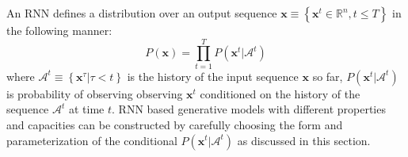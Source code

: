 \documentclass{article} %
\begin{document}





An RNN defines a distribution over an output sequence $ \mathbf{x} \equiv \left\{ \mathbf{x}^t \in \mathbb{R}^n, t \leq T \right\}$ in the following manner:
$$ P(\mathbf{x}) = \prod_{t=1}^{T} P(\mathbf{x}^t|\mathcal{A}^t)$$
where $\mathcal{A}^t \equiv \left\{ \mathbf{x}^{\tau}|\tau < t \right\}$ is the history of the input sequence $\mathbf{x}$ so far, $P(\mathbf{x}^t|\mathcal{A}^t)$ is probability of observing observing $\mathbf{x}^t$ conditioned on the history of the sequence $\mathcal{A}^t$ at time $t$. RNN based generative models with different properties and capacities can be constructed by carefully choosing the form and parameterization of the conditional $P(\mathbf{x}^t|\mathcal{A}^t)$ as discussed in this section. 
\end{document}
